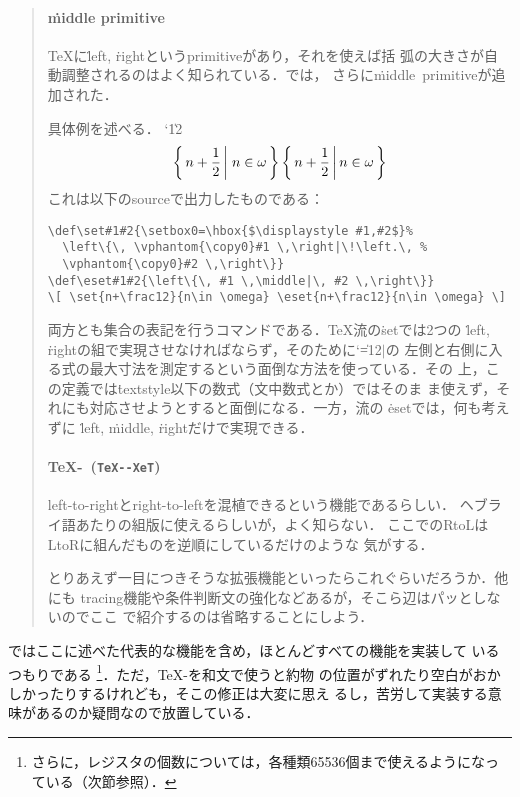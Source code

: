 \documentclass[a4paper,11pt,nomag,dvipdfmx]{jsarticle}
\def\TeXXeT{\TeX-\reflectbox{\bfseries\TeX-}}
\begin{document}
\begin{quotation}
\paragraph{\.{middle} primitive}
\TeX に\.{left}, \.{right}というprimitiveがあり，それを使えば括
弧の大きさが自動調整されるのはよく知られている．\eTeX では，
さらに\.{middle}\ primitiveが追加された．

具体例を述べる．
{\catcode`\|12
\def\set#1#2{\setbox0=\hbox{$\displaystyle #1,#2$}%
\left\{\, \vphantom{\copy0}#1 \,\right|\!\left.\, \vphantom{\copy0}#2 \,\right\}}
\def\eset#1#2{\left\{\, #1 \,\middle|\, #2 \,\right\}}
\[ \set{n+\frac12}{n\in \omega} \eset{n+\frac12}{n\in \omega} \]}
これは以下のsourceで出力したものである：

{\narrowbaselines
\begin{verbatim}
\def\set#1#2{\setbox0=\hbox{$\displaystyle #1,#2$}%
  \left\{\, \vphantom{\copy0}#1 \,\right|\!\left.\, %
  \vphantom{\copy0}#2 \,\right\}}
\def\eset#1#2{\left\{\, #1 \,\middle|\, #2 \,\right\}}
\[ \set{n+\frac12}{n\in \omega} \eset{n+\frac12}{n\in \omega} \]
\end{verbatim}}
両方とも集合の表記を行うコマンドである．\TeX 流の\.{set}では2つの
\.{left}, \.{right}の組で実現させなければならず，そのために{\catcode`\|=12$|$}の
左側と右側に入る式の最大寸法を測定するという面倒な方法を使っている．その
上，この定義では\.{textstyle}以下の数式（文中数式とか）ではそのま
ま使えず，それにも対応させようとすると面倒になる．一方，\eTeX 流の
\.{eset}では，何も考えずに
\.{left}, \.{middle}, \.{right}だけで実現できる．

\paragraph{\TeXXeT\ \textmd{(\texttt{TeX-{}-XeT})}}
left-to-rightとright-to-leftを混植できるという機能であるらしい．
ヘブライ語あたりの組版に使えるらしいが，よく知らない．
ここでのRtoLはLtoRに組んだものを逆順にしているだけのような
気がする．

\medskip

とりあえず一目につきそうな拡張機能といったらこれぐらいだろうか．他にも
tracing機能や条件判断文の強化などあるが，そこら辺はパッとしないのでここ
で紹介するのは省略することにしよう．
\end{quotation}

\epTeX ではここに述べた代表的な機能を含め，ほとんどすべての機能を実装して
いるつもりである
\footnote{%
  さらに，レジスタの個数については，各種類65536個まで使えるようになっている（次節参照）．
}．ただ，\TeXXeT を和文で使うと約物
の位置がずれたり空白がおかしかったりするけれども，そこの修正は大変に思え
るし，苦労して実装する意味があるのか疑問なので放置している．
\end{document}
